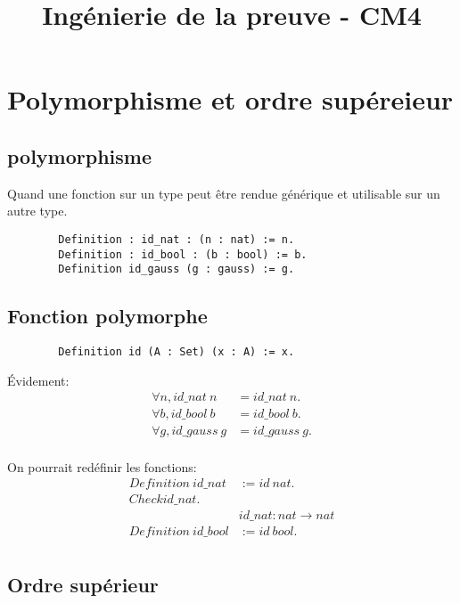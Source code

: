 \documentclass[11pt,a4paper]{article}
\title{Ingénierie de la preuve - CM4}
\begin{document}
	
	\maketitle
	
	\section{Polymorphisme et ordre supéreieur}
	
	\subsection{polymorphisme}
	
	Quand une fonction sur un type peut être rendue générique et utilisable sur un autre type.
	
	\begin{verbatim}
		Definition : id_nat : (n : nat) := n.
		Definition : id_bool : (b : bool) := b.
		Definition id_gauss (g : gauss) := g.
	\end{verbatim}
	
	\subsection{Fonction polymorphe}
	
	\begin{verbatim}
		Definition id (A : Set) (x : A) := x.
	\end{verbatim}
	
	Évidement:
	\begin{align*}
	\forall n, id\_nat\ n &= id\_nat\ n.\\
	\forall b, id\_bool\ b &= id\_bool\ b.\\
	\forall g, id\_gauss\ g &= id\_gauss\ g.\\
	\end{align*}
	
	On pourrait redéfinir les fonctions:
	\begin{align*}
		Definition\ id\_nat &:= id\ nat.\\
		Check id\_nat.&\\
			&id\_nat : nat \to nat\\
		Definition\ id\_bool &:= id\ bool.\\
	\end{align*}
	
	\subsection{Ordre supérieur}
	
\end{document}
